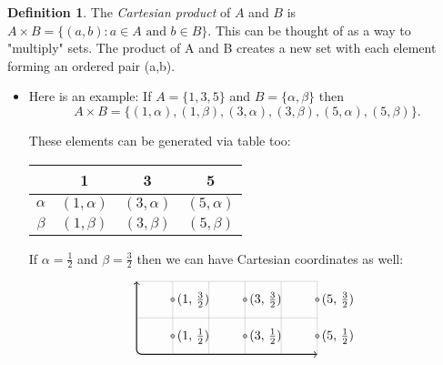 \documentclass{amsart} %
\theoremstyle{definition} %
\newtheorem*{dfn}{Definition} %
\theoremstyle{definition}
\theoremstyle{remark} %
\begin{document}
\begin{dfn}
 \quad The \emph{Cartesian product} of $A$ and $B$ is $A \times B = \{(a,b): a \in A \text{ and } b \in B \} $. This can be thought of as a way to "multiply" sets. The product of A and B creates a new set with each element forming an ordered pair (a,b).
      \begin{itemize}
            \item Here is an example: If $A = \{1, 3, 5 \}$ and $B = \{\alpha, \beta \} $ then
                  \[ A \times B = \{(1, \alpha), (1, \beta), (3, \alpha), (3, \beta), (5, \alpha), (5, \beta) \}. \]

                  These elements can be generated via table too:
                  \begin{center}
                  \begin{tabular}{c | c | c | c}
                        & 1 & 3 & 5 \\
                        \hline
                        $\alpha$ & $(1, \alpha)$ & $(3, \alpha)$ & $(5, \alpha)$ \\
                        $\beta$ & $(1, \beta)$ & $(3, \beta)$ & $(5, \beta)$ \\
                  \end{tabular}
                  \end{center}

                  If $\alpha = \frac{1}{2}$ and $\beta = \frac{3}{2}$ then we can have Cartesian coordinates as well:

                 \[ \begin{tikzpicture}
                        \draw[<->, rounded corners, thick] (0,2) -- (0,0) -- (5, 0);
                        \draw[help lines] (0, 0) grid (5, 2);
                        \draw[fill = lightgray] (1, 0.5) circle [radius = 0.05];
                        \node [right] at (1, 0.5) {(1, $\frac{1}{2}$)};
                        \draw[fill = lightgray] (3, 0.5) circle [radius = 0.05];
                        \node [right] at (3, 0.5) {(3, $\frac{1}{2}$)};
                        \draw[fill = lightgray] (5, 0.5) circle [radius = 0.05];
                        \node [right] at (5, 0.5) {(5, $\frac{1}{2}$)};
                        \draw[fill = lightgray] (1, 1.5) circle [radius = 0.05];
                        \node [right] at (1, 1.5) {(1, $\frac{3}{2}$)};
                        \draw[fill = lightgray] (3, 1.5) circle [radius = 0.05];
                        \node [right] at (3, 1.5) {(3, $\frac{3}{2}$)};
                        \draw[fill = lightgray] (5, 1.5) circle [radius = 0.05];
                        \node [right] at (5, 1.5) {(5, $\frac{3}{2}$)};
                  \end{tikzpicture} \]

      \end{itemize}
\end{dfn}
\end{document}

